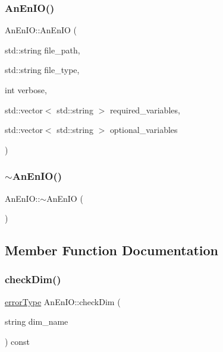 \mbox{\label{class_an_en_i_o_a054dfff57b8d02d333020d9efb54f14a}} 
\subsubsection{\texorpdfstring{An\+En\+I\+O()}{AnEnIO()}\hspace{0.1cm}{\footnotesize\ttfamily [6/6]}}
{\footnotesize\ttfamily An\+En\+I\+O\+::\+An\+En\+IO (\begin{DoxyParamCaption}\item[{std\+::string}]{file\+\_\+path,  }\item[{std\+::string}]{file\+\_\+type,  }\item[{int}]{verbose,  }\item[{std\+::vector$<$ std\+::string $>$}]{required\+\_\+variables,  }\item[{std\+::vector$<$ std\+::string $>$}]{optional\+\_\+variables }\end{DoxyParamCaption})}

\mbox{\label{class_an_en_i_o_a1e7aef95fd2a0c6aaef55998f48368f4}} 
\subsubsection{\texorpdfstring{$\sim$\+An\+En\+I\+O()}{~AnEnIO()}}
{\footnotesize\ttfamily An\+En\+I\+O\+::$\sim$\+An\+En\+IO (\begin{DoxyParamCaption}{ }\end{DoxyParamCaption})\hspace{0.3cm}{\ttfamily [virtual]}}



\subsection{Member Function Documentation}
\mbox{\label{class_an_en_i_o_ab99f9aebd7b145de00fe15b8d4869ac2}} 
\subsubsection{\texorpdfstring{check\+Dim()}{checkDim()}}
{\footnotesize\ttfamily \mbox{\hyperlink{class_an_en_i_o_aa56bc1ec6610b86db4349bce20f9ead0}{error\+Type}} An\+En\+I\+O\+::check\+Dim (\begin{DoxyParamCaption}\item[{string}]{dim\+\_\+name }\end{DoxyParamCaption}) const}


